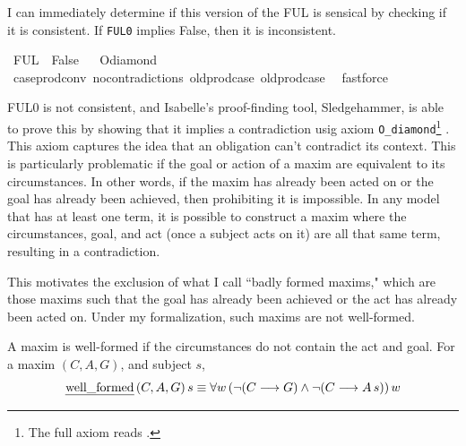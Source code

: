 \begin{isabellebody}
\begin{isamarkuptext}
I can immediately determine if this version of the FUL is sensical by checking if it is consistent.
If \texttt{FUL0} implies False, then it is inconsistent.%
\end{isamarkuptext}\isamarkuptrue%
\isamarkupfalse%
\ {\isachardoublequoteopen}FUL{}\ {\isasymlongrightarrow}\ False{\isachardoublequoteclose}%
\isadelimproof
\ %
\endisadelimproof
%
\isatagproof
{}\isamarkupfalse%
\ O{\isacharunderscore}diamond\isanewline
\ \ \isamarkupfalse%
\ case{\isacharunderscore}prod{\isacharunderscore}conv\ no{\isacharunderscore}contradictions\ old{\isachardot}prod{\isachardot}case\ old{\isachardot}prod{\isachardot}case\ \isamarkupfalse%
\ fastforce%
\endisatagproof
{\isafoldproof}%
%
\isadelimproof
%
\endisadelimproof
%
\begin{isamarkuptext}%
FUL0 is not consistent, and Isabelle's proof-finding tool, Sledgehammer, is able to prove this by showing that it implies a contradiction 
usig axiom \texttt{O\_diamond}\footnote{The full axiom reads .} \citep{sledgehammer}. 
This axiom captures the idea that an obligation can't contradict its context. This is particularly problematic 
if the goal or action of a maxim are equivalent to its circumstances. In other words, if the maxim has already been 
acted on or the goal has already been achieved, then prohibiting it is impossible. 
In any model that has at least one term, it is possible to construct a maxim where the circumstances, goal, 
and act (once a subject acts on it) are all that same term, resulting in a contradiction. 

This motivates the exclusion of what I call ``badly formed maxims," which are those maxims such that 
the goal has already been achieved or the act has already been acted on. Under my formalization, such maxims are
not well-formed. 

\begin{definition}
A maxim is well-formed if the circumstances do not contain the act and goal. For a maxim $(C, A, G)$, and subject $s$, 
$$ \text{\emph{well\_formed}} \, (C, A, G) \, s \equiv \forall w \, (\neg (C \longrightarrow G) \wedge \neg (C \longrightarrow A \, s)) \, w$$

\end{definition}


\end{isamarkuptext}
\end{isabellebody}
